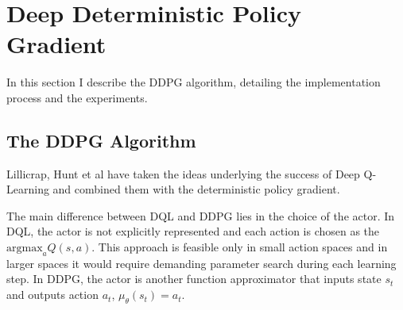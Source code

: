 

\chapter{Deep Deterministic Policy Gradient}
\label{chapter:ddpg}

In this section I describe the DDPG algorithm, detailing the implementation process and the experiments.

\section{The DDPG Algorithm}

Lillicrap, Hunt et al \cite{cite:DDPG} have taken the ideas underlying the success of Deep Q-Learning and combined them with the deterministic policy gradient. 

The main difference between DQL and DDPG lies in the choice of the actor. In DQL, the actor is not explicitly represented and each action is chosen as the $\text{argmax}_a Q(s,a)$. This approach is feasible only in small action spaces and in larger spaces it would require demanding parameter search during each learning step. In DDPG, the actor is another function approximator that inputs state $s_t$ and outputs action $a_t$, $\mu_\theta(s_t)=a_t$.

